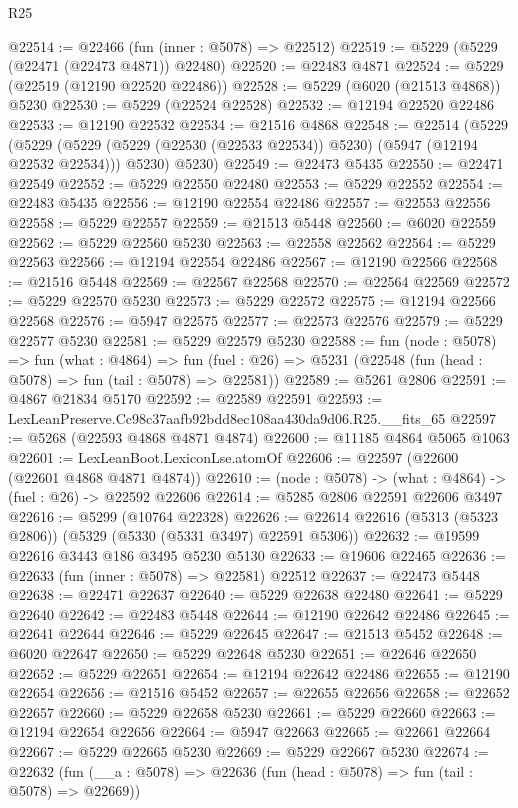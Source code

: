 \begin{lexlean}{R25}
\begin{coremodule}
@22514 := @22466 (fun (inner : @5078) => @22512)
@22519 := @5229 (@5229 (@22471 (@22473 @4871)) @22480)
@22520 := @22483 @4871
@22524 := @5229 (@22519 (@12190 @22520 @22486))
@22528 := @5229 (@6020 (@21513 @4868)) @5230
@22530 := @5229 (@22524 @22528)
@22532 := @12194 @22520 @22486
@22533 := @12190 @22532
@22534 := @21516 @4868
@22548 := @22514
    (@5229
      (@5229 (@5229 (@5229 (@22530 (@22533 @22534)) @5230) (@5947 (@12194 @22532 @22534))) @5230)
      @5230)
@22549 := @22473 @5435
@22550 := @22471 @22549
@22552 := @5229 @22550 @22480
@22553 := @5229 @22552
@22554 := @22483 @5435
@22556 := @12190 @22554 @22486
@22557 := @22553 @22556
@22558 := @5229 @22557
@22559 := @21513 @5448
@22560 := @6020 @22559
@22562 := @5229 @22560 @5230
@22563 := @22558 @22562
@22564 := @5229 @22563
@22566 := @12194 @22554 @22486
@22567 := @12190 @22566
@22568 := @21516 @5448
@22569 := @22567 @22568
@22570 := @22564 @22569
@22572 := @5229 @22570 @5230
@22573 := @5229 @22572
@22575 := @12194 @22566 @22568
@22576 := @5947 @22575
@22577 := @22573 @22576
@22579 := @5229 @22577 @5230
@22581 := @5229 @22579 @5230
@22588 := fun (node : @5078) =>
  fun (what : @4864) =>
  fun (fuel : @26) => @5231 (@22548 (fun (head : @5078) => fun (tail : @5078) => @22581))
@22589 := @5261 @2806
@22591 := @4867 @21834 @5170
@22592 := @22589 @22591
@22593 := LexLeanPreserve.Cc98c37aafb92bdd8ec108aa430da9d06.R25.__fits_65
@22597 := @5268 (@22593 @4868 @4871 @4874)
@22600 := @11185 @4864 @5065 @1063
@22601 := LexLeanBoot.LexiconLse.atomOf
@22606 := @22597 (@22600 (@22601 @4868 @4871 @4874))
@22610 := (node : @5078) -> (what : @4864) -> (fuel : @26) -> @22592 @22606
@22614 := @5285 @2806 @22591 @22606 @3497
@22616 := @5299 (@10764 @22328)
@22626 := @22614 @22616 (@5313 (@5323 @2806)) (@5329 (@5330 (@5331 @3497) @22591 @5306))
@22632 := @19599 @22616 @3443 @186 @3495 @5230 @5130
@22633 := @19606 @22465
@22636 := @22633 (fun (inner : @5078) => @22581) @22512
@22637 := @22473 @5448
@22638 := @22471 @22637
@22640 := @5229 @22638 @22480
@22641 := @5229 @22640
@22642 := @22483 @5448
@22644 := @12190 @22642 @22486
@22645 := @22641 @22644
@22646 := @5229 @22645
@22647 := @21513 @5452
@22648 := @6020 @22647
@22650 := @5229 @22648 @5230
@22651 := @22646 @22650
@22652 := @5229 @22651
@22654 := @12194 @22642 @22486
@22655 := @12190 @22654
@22656 := @21516 @5452
@22657 := @22655 @22656
@22658 := @22652 @22657
@22660 := @5229 @22658 @5230
@22661 := @5229 @22660
@22663 := @12194 @22654 @22656
@22664 := @5947 @22663
@22665 := @22661 @22664
@22667 := @5229 @22665 @5230
@22669 := @5229 @22667 @5230
@22674 := @22632 (fun (__a : @5078) => @22636 (fun (head : @5078) => fun (tail : @5078) => @22669))

\end{coremodule}
\end{lexlean}
